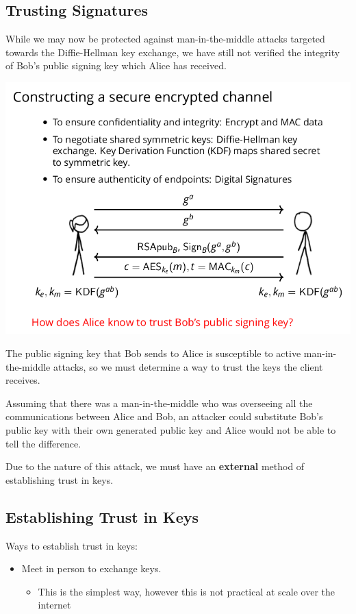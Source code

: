 \documentclass[11pt]{article} %
\begin{document}
{\newpage
\subsection{Trusting Signatures}
While we may now be protected against man-in-the-middle attacks targeted towards
the Diffie-Hellman key exchange, we have still not verified the integrity of
Bob's public signing key which Alice has received.

\includegraphics[scale=.7]{./tls4.png}

The public signing key that Bob sends to Alice is susceptible to
active man-in-the-middle attacks, so we must determine a way to trust the keys 
the client receives.

\bigskip
Assuming that there was a man-in-the-middle who was overseeing all the
communications between Alice and Bob, an attacker could substitute Bob's public
key with their own generated public key and Alice would not be able to tell 
the difference.

\bigskip
Due to the nature of this attack, we must have an \textbf{external} method of
establishing trust in keys.

\newpage
\subsection{Establishing Trust in Keys}
Ways to establish trust in keys:
\begin{itemize}
  \item Meet in person to exchange keys.
  \begin{itemize}\item This is the simplest way, however this is not practical at scale over the internet
  \end{itemize}
\end{itemize}



}
\end{document}
